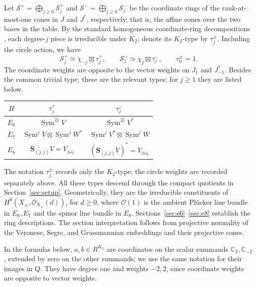 \documentclass[11pt]{article}
\newcommand{\C}{\mathbb C}
\newcommand{\OO}{\mathcal O}
\newcommand{\Sym}{\operatorname{Sym}}
\newcommand{\bS}{\mathbf S}
\theoremstyle{definition}
\numberwithin{equation}{section}
\begin{document}
Let $\mathcal S^+=\bigoplus_{j\geq0}\mathcal S_j^+$ and
$\mathcal S^-=\bigoplus_{j\geq0}\mathcal S_j^-$ be the coordinate
rings of the rank-at-most-one cones in $J$ and $J^*$, respectively,
that is, the affine cones over the two bases in the table.
By the standard homogeneous coordinate-ring decompositions
\cite{Fulton,FH}, each degree-$j$ piece is irreducible under $K_2$;
denote its $K_2$-type by $\tau_j^\pm$. Including the circle action, we have
\[
 \mathcal S_j^+\simeq\chi_{-j}\boxtimes\tau_j^+,
 \qquad
 \mathcal S_j^-\simeq\chi_j\boxtimes\tau_j^-,
 \qquad \tau_0^\pm=1.
\]
The coordinate weights are opposite to the vector weights on
$J_1$ and $J^*_{-1}$. Besides the common trivial type, these are the
relevant types; for $j\geq1$ they are listed below.
\begin{center}
\begin{tabular}{c c c}
\toprule
$H$ & $\tau_j^+$ & $\tau_j^-$ \\
\midrule
$E_6$ & $\Sym^{2j}V$ & $\Sym^{2j}V^*$ \\
$E_7$ & $\Sym^jV\otimes\Sym^jW^*$ & $\Sym^jV^*\otimes\Sym^jW$ \\
$E_8$ & $\bS_{(j,j)}V=V_{j\omega_2}$ & $(\bS_{(j,j)}V)^*=V_{j\omega_6}$ \\
\bottomrule
\end{tabular}
\end{center}
The notation $\tau_j^\pm$ records only the $K_2$-type; the circle
weights are recorded separately above. All these types descend through
the compact quotients in Section~\ref{sec:setup}.
Geometrically, they are the irreducible constituents of
$H^0(X_\pm,\OO_{X_\pm}(d))$, for $d\geq0$, where $\OO(1)$ is the
ambient Pl\"ucker line bundle in $E_6,E_7$ and the spinor line bundle
in $E_8$. Sections~\ref{sec:e6}--\ref{sec:e8} establish the ring
descriptions. The section interpretation follows from projective
normality of the Veronese, Segre, and Grassmannian embeddings and
their projective cones.

In the formulas below, $a,b\in R^{K_2}$ are coordinates on the scalar
summands $\C_2,\C_{-2}$, extended by zero on the other summands;
we use the same notation for their images in $Q$. They have degree
one and weights $-2,2$, since coordinate weights are opposite to vector
weights.
\end{document}
